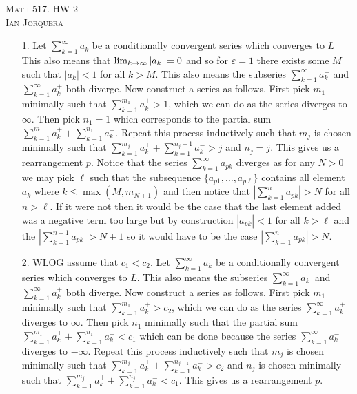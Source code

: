 \documentclass[12pt]{amsart}
\begin{document}
\begin{center}
    \textsc{Math 517. HW 2\\ Ian Jorquera}
\end{center}
\vspace{1em}

\begin{itemize}
    \item[1.] Let $\sum_{k=1}^{\infty}{a_k}$ be a conditionally convergent series which
        converges to $L$ This also means that $\lim_{k\rightarrow\infty}|a_k|=0$ and so for
        $\varepsilon=1$ there exists some $M$ such that $|a_k|<1$ for all $k>M$. This
        also means the subseries $\sum_{k=1}^{\infty}{a^-_k}$ and
        $\sum_{k=1}^{\infty}{a^+_k}$ both diverge. Now construct a series as follows.
        First pick $m_1$ minimally such that $\sum_{k=1}^{m_1}{a^+_k}> 1$, which we can
        do as the series diverges to $\infty$. Then pick $n_1=1$ which corresponds to
        the partial sum $\sum_{k=1}^{m_1}{a^+_k}+\sum_{k=1}^{n_1}{a^-_k}$. Repeat this
        process inductively such that $m_j$ is chosen minimally such that
        $\sum_{k=1}^{m_j}{a^+_k}+\sum_{k=1}^{n_{j}-1}{a^-_k}> j$ and $n_j=j$. This
        gives us a rearrangement $p$. Notice that the series
        $\sum_{k=1}^{\infty}{a_{pk}}$ diverges as for any $N>0$ we may pick $\ell$ such
        that the subsequence $\{a_{p1},\dots,a_{p\ell}\}$ contains all element $a_k$
        where $k\leq\max{(M, m_{N+1})}$ and then notice that
        $|\sum_{k=1}^{n}{a_{pk}}|>N$ for all $n>\ell$. If it were not then it would be
        the case that the last element added was a negative term too large but by
        construction $|a_{pk}|<1$ for all $k>\ell$ and the
        $|\sum_{k=1}^{n-1}{a_{pk}}|>N+1$ so it would have to be the case
        $|\sum_{k=1}^{n}{a_{pk}}|>N$.

    \item[2.]
        WLOG assume that $c_1<c_2$. Let $\sum_{k=1}^{\infty}{a_k}$ be a conditionally
        convergent series which converges to $L$. This also means the subseries
        $\sum_{k=1}^{\infty}{a^-_k}$ and $\sum_{k=1}^{\infty}{a^+_k}$ both diverge. Now
        construct a series as follows. First pick $m_1$ minimally such that
        $\sum_{k=1}^{m_1}{a^+_k}> c_2$, which we can do as the series
        $\sum_{k=1}^{\infty}{a^+_k}$ diverges to $\infty$. Then pick $n_1$ minimally
        such that the partial sum $\sum_{k=1}^{m_1}{a^+_k}+\sum_{k=1}^{n_1}{a^-_k}<c_1$
        which can be done because the series $\sum_{k=1}^{\infty}{a^-_k}$ diverges to
        $-\infty$. Repeat this process inductively such that $m_j$ is chosen minimally
        such that $\sum_{k=1}^{m_j}{a^+_k}+\sum_{k=1}^{n_{j-1}}{a^-_k}> c_2$ and $n_j$
        is chosen minimally such that
        $\sum_{k=1}^{m_j}{a^+_k}+\sum_{k=1}^{n_{j}}{a^-_k}< c_1$. This gives us a
        rearrangement $p$.


\end{itemize}
\end{document}
